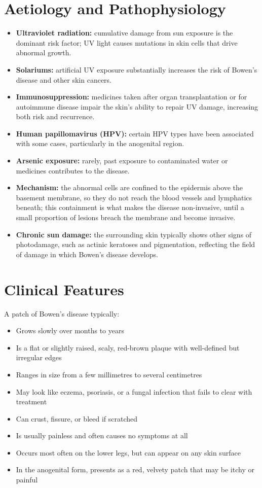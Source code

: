 \section*{Aetiology and Pathophysiology}
\begin{itemize}
    \item \textbf{Ultraviolet radiation:} cumulative damage from sun exposure is the dominant risk factor; UV light causes mutations in skin cells that drive abnormal growth.
    \item \textbf{Solariums:} artificial UV exposure substantially increases the risk of Bowen's disease and other skin cancers.
    \item \textbf{Immunosuppression:} medicines taken after organ transplantation or for autoimmune disease impair the skin's ability to repair UV damage, increasing both risk and recurrence.
    \item \textbf{Human papillomavirus (HPV):} certain HPV types have been associated with some cases, particularly in the anogenital region.
    \item \textbf{Arsenic exposure:} rarely, past exposure to contaminated water or medicines contributes to the disease.
    \item \textbf{Mechanism:} the abnormal cells are confined to the epidermis above the basement membrane, so they do not reach the blood vessels and lymphatics beneath; this containment is what makes the disease non-invasive, until a small proportion of lesions breach the membrane and become invasive.
    \item \textbf{Chronic sun damage:} the surrounding skin typically shows other signs of photodamage, such as actinic keratoses and pigmentation, reflecting the field of damage in which Bowen's disease develops.
\end{itemize}

\section*{Clinical Features}
A patch of Bowen's disease typically:
\begin{itemize}
    \item Grows slowly over months to years
    \item Is a flat or slightly raised, scaly, red-brown plaque with well-defined but irregular edges
    \item Ranges in size from a few millimetres to several centimetres
    \item May look like eczema, psoriasis, or a fungal infection that fails to clear with treatment
    \item Can crust, fissure, or bleed if scratched
    \item Is usually painless and often causes no symptoms at all
    \item Occurs most often on the lower legs, but can appear on any skin surface
    \item In the anogenital form, presents as a red, velvety patch that may be itchy or painful
\end{itemize}

